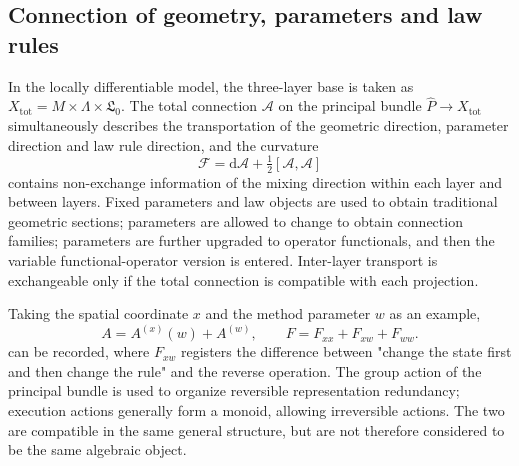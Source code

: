 \documentclass[11pt,a4paper]{article}
\theoremstyle{plain}
\theoremstyle{definition}
\theoremstyle{remark}
\begin{document}
\begin{CJK*}
\subsection { Connection of geometry, parameters and law rules }

In the locally differentiable model, the three-layer base is taken as $X_{\mathrm{tot}}=M\times\Lambda\times\mathfrak L_0$. The total connection $\mathcal A$ on the principal bundle $\widehat P\to X_{\mathrm{tot}}$ simultaneously describes the transportation of the geometric direction, parameter direction and law rule direction, and the curvature \[
 \mathcal F=\mathrm d\mathcal A+\tfrac12[\mathcal A,\mathcal A]
\] contains non-exchange information of the mixing direction within each layer and between layers. Fixed parameters and law objects are used to obtain traditional geometric sections; parameters are allowed to change to obtain connection families; parameters are further upgraded to operator functionals, and then the variable functional-operator version is entered. Inter-layer transport is exchangeable only if the total connection is compatible with each projection. \cite{S01,S05}

Taking the spatial coordinate $x$ and the method parameter $w$ as an example, \[
 A=A^{(x)}(w)+A^{(w)},\qquad
 F=F_{xx}+F_{xw}+F_{ww}.
\] can be recorded, where $F_{xw}$ registers the difference between "change the state first and then change the rule" and the reverse operation. The group action of the principal bundle is used to organize reversible representation redundancy; execution actions generally form a monoid, allowing irreversible actions. The two are compatible in the same general structure, but are not therefore considered to be the same algebraic object.


\end{CJK*}
\end{document}
